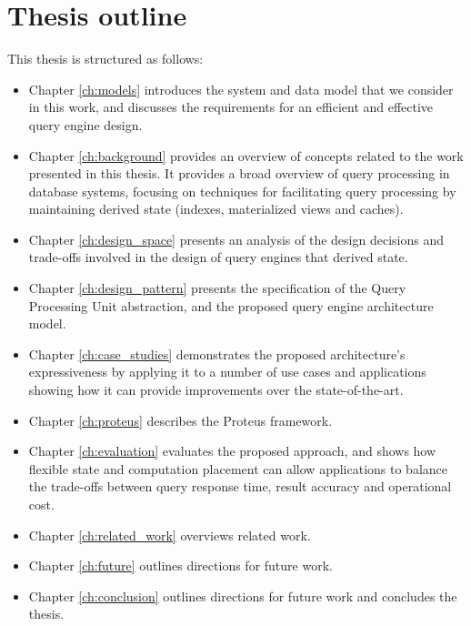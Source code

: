 \section{Thesis outline}

This thesis is structured as follows:

\begin{itemize}

  \item Chapter \ref{ch:models} introduces the system and data model that we consider in this work,
  and discusses the requirements for an efficient and effective query engine design.

  \item Chapter \ref{ch:background} provides an overview of concepts related to the work presented in this thesis.
  It provides a broad overview of query processing in database systems,
  focusing on techniques for facilitating query processing by maintaining derived state (indexes, materialized views and caches).

  \item Chapter \ref{ch:design_space} presents an analysis of the design decisions and trade-offs involved in the design
  of query engines that derived state.

  \item Chapter \ref{ch:design_pattern} presents the specification of the Query Processing Unit abstraction,
  and the proposed query engine architecture model.

  \item Chapter \ref{ch:case_studies} demonstrates the proposed architecture's expressiveness by applying it to a number
  of use cases and applications showing how it can provide improvements over the state-of-the-art.

  \item Chapter \ref{ch:proteus} describes the Proteus framework.

  \item Chapter \ref{ch:evaluation} evaluates the proposed approach,
  and shows how flexible state and computation placement can allow applications to balance the trade-offs between
  query response time, result accuracy and operational cost.

  \item Chapter \ref{ch:related_work} overviews related work.

  \item Chapter \ref{ch:future} outlines directions for future work.

  \item Chapter \ref{ch:conclusion} outlines directions for future work and concludes the thesis.
\end{itemize}

